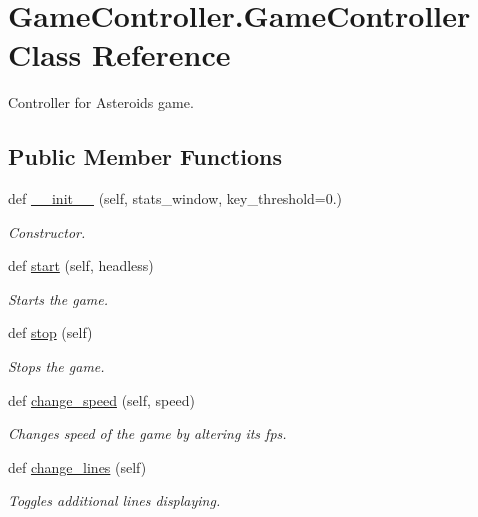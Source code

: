 \hypertarget{classGameController_1_1GameController}{}\section{Game\+Controller.\+Game\+Controller Class Reference}
\label{classGameController_1_1GameController}


Controller for Asteroids game.  


\subsection*{Public Member Functions}
\begin{DoxyCompactItemize}
\item 
def \hyperlink{classGameController_1_1GameController_a8e0ebfe57e0c1850047d4f271e296187}{\+\_\+\+\_\+init\+\_\+\+\_\+} (self, stats\+\_\+window, key\+\_\+threshold=0.)
\begin{DoxyCompactList}\small\item\em Constructor. \end{DoxyCompactList}\item 
def \hyperlink{classGameController_1_1GameController_a000e1b43edbc5454673763a491f53d27}{start} (self, headless)
\begin{DoxyCompactList}\small\item\em Starts the game. \end{DoxyCompactList}\item 
def \hyperlink{classGameController_1_1GameController_adceb4b825410df4ac33c63732c5ebb1c}{stop} (self)
\begin{DoxyCompactList}\small\item\em Stops the game. \end{DoxyCompactList}\item 
def \hyperlink{classGameController_1_1GameController_a6e9c793d9f9c7f91ef86fdfbad1f399c}{change\+\_\+speed} (self, speed)
\begin{DoxyCompactList}\small\item\em Changes speed of the game by altering it\textquotesingle{}s fps. \end{DoxyCompactList}\item 
def \hyperlink{classGameController_1_1GameController_a6df31616562721415f855506ac39200e}{change\+\_\+lines} (self)
\begin{DoxyCompactList}\small\item\em Toggles additional lines displaying. \end{DoxyCompactList}\item 

\end{DoxyCompactItemize}
